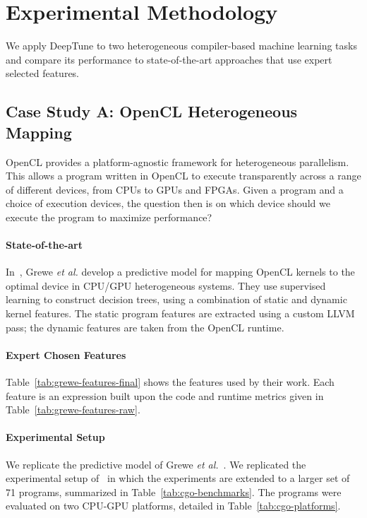 \section{Experimental Methodology}\label{sec:methodology}

We apply DeepTune to two heterogeneous compiler-based machine learning tasks and compare its performance to state-of-the-art approaches that use expert selected features.


\subsection{Case Study A: OpenCL Heterogeneous Mapping} \label{subsec:case-study-a}



OpenCL provides a platform-agnostic framework for heterogeneous parallelism. This allows a program written in OpenCL to execute transparently across a range of different devices, from CPUs to GPUs and FPGAs. Given a program and a choice of execution devices, the question then is on which device should we execute the program to maximize performance?

\paragraph{State-of-the-art} In~\cite{Grewe2013}, Grewe \emph{et al.} develop a predictive model for mapping OpenCL kernels to the optimal device in CPU/GPU heterogeneous systems. They use supervised learning to construct decision trees, using a combination of static and dynamic kernel features. The static program features are extracted using a custom LLVM pass; the dynamic features are taken from the OpenCL runtime.

\paragraph{Expert Chosen Features} Table~\ref{tab:grewe-features-final} shows the features used by their work. Each feature is an expression built upon the code and runtime metrics given in Table~\ref{tab:grewe-features-raw}.

\paragraph{Experimental Setup} We replicate the predictive model of Grewe \emph{et al.}~\cite{Grewe2013}. We replicated the experimental setup of~\cite{Cummins2017a} in which the experiments are extended to a larger set of 71 programs, summarized in Table~\ref{tab:cgo-benchmarks}. The programs were evaluated on two CPU-GPU platforms, detailed in Table~\ref{tab:cgo-platforms}.

